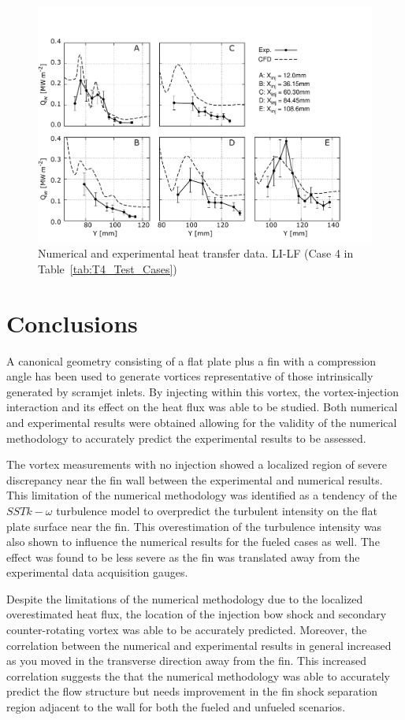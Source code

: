 \documentclass{AIAA}
\begin{document}
%
\begin{figure}[!h]
\center
\includegraphics[trim = 0mm 3mm 25mm 25mm, clip, width=0.60\columnwidth,valign=t,fbox]{Figures/Data/LP_LI_LF/GNUP_CFD_GaugesLines_Multi.pdf}
\caption{Numerical and experimental heat transfer data. LI-LF (Case 4 in Table~\ref{tab:T4_Test_Cases})}
\label{fig:HeatFluxLPLILF}
\end{figure} 


\section{Conclusions}

A canonical geometry consisting of a flat plate plus a fin with a compression angle has been used to generate vortices representative of those intrinsically generated by scramjet inlets.
By injecting within this vortex, the vortex-injection interaction and its effect on the heat flux was able to be studied.
Both numerical and experimental results were obtained allowing for the validity of the numerical methodology to accurately predict the experimental results to be assessed.

The vortex measurements with no injection showed a localized region of severe discrepancy near the fin wall between the experimental and numerical results.
This limitation of the numerical methodology was identified as a tendency of the $SST k-\omega$ turbulence model to overpredict the turbulent intensity on the flat plate surface near the fin.
This overestimation of the turbulence intensity was also shown to influence the numerical results for the fueled cases as well.
The effect was found to be less severe as the fin was translated away from the experimental data acquisition gauges.


Despite the limitations of the numerical methodology due to the localized overestimated heat flux, the location of the injection bow shock and secondary counter-rotating vortex was able to be accurately predicted.
Moreover, the correlation between the numerical and experimental results in general increased as you moved in the transverse direction away from the fin.
This increased correlation suggests the that the numerical methodology was able to accurately predict the flow structure but needs improvement in the fin shock separation region adjacent to the wall for both the fueled and unfueled scenarios.
\end{document}
